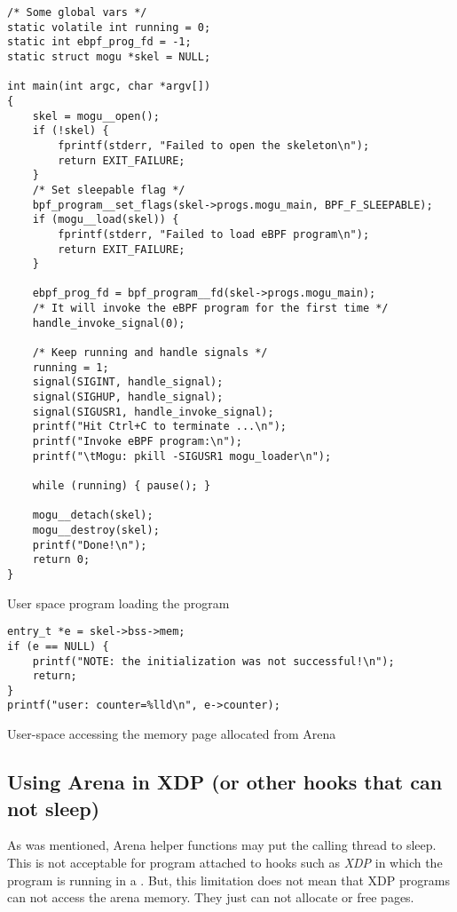 \documentclass{article}
\begin{document}
\begin{listing}
\begin{verbatim}
/* Some global vars */
static volatile int running = 0;
static int ebpf_prog_fd = -1;
static struct mogu *skel = NULL;

int main(int argc, char *argv[])
{
    skel = mogu__open();
    if (!skel) {
        fprintf(stderr, "Failed to open the skeleton\n");
        return EXIT_FAILURE;
    }
    /* Set sleepable flag */
    bpf_program__set_flags(skel->progs.mogu_main, BPF_F_SLEEPABLE);
    if (mogu__load(skel)) {
        fprintf(stderr, "Failed to load eBPF program\n");
        return EXIT_FAILURE;
    }

    ebpf_prog_fd = bpf_program__fd(skel->progs.mogu_main);
    /* It will invoke the eBPF program for the first time */
    handle_invoke_signal(0);

    /* Keep running and handle signals */
    running = 1;
    signal(SIGINT, handle_signal);
    signal(SIGHUP, handle_signal);
    signal(SIGUSR1, handle_invoke_signal);
    printf("Hit Ctrl+C to terminate ...\n");
    printf("Invoke eBPF program:\n");
    printf("\tMogu: pkill -SIGUSR1 mogu_loader\n");

    while (running) { pause(); }

    mogu__detach(skel);
    mogu__destroy(skel);
    printf("Done!\n");
    return 0;
}
\end{verbatim}
\caption{User space program loading the program}
\label{lst:loader}
\end{listing}

\begin{listing}
\begin{verbatim}
entry_t *e = skel->bss->mem;
if (e == NULL) {
    printf("NOTE: the initialization was not successful!\n");
    return;
}
printf("user: counter=%lld\n", e->counter);
\end{verbatim}
\caption{User-space accessing the memory page allocated from Arena}
\label{lst:loader_read}
\end{listing}


\subsection{Using Arena in XDP (or other hooks that can not sleep)}

As was mentioned, Arena helper functions may put the calling thread to sleep.
This is not acceptable for program attached to hooks such as \emph{XDP} in
which the program is running in a . But, this limitation does not mean
that XDP programs can not access the arena memory. They just can not allocate or
free pages.
\end{document}
